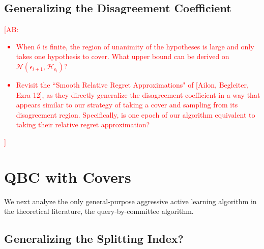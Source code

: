 \documentclass{article}[12pt]
\newcommand{\authcmt}[2]{\ifnum\Comments=1\textcolor{#1}{#2}\fi}
\newcommand{\akshay}[1]{\authcmt{red}      {[AB: #1]}}
\theoremstyle{named}
\newcommand{\cH}{\mathcal{H}}
\newcommand{\cN}{\mathcal{N}}
\begin{document}
\newpage
\subsection{Generalizing the Disagreement Coefficient}

\akshay{ 
\begin{itemize}
\item
When $\theta$ is finite, the region of unanimity of the hypotheses is large and only takes one hypothesis to cover. 
What upper bound can be derived on $\cN(\epsilon_{i+1}, \cH_{\epsilon_i})$?
\item
Revisit the ``Smooth Relative Regret Approximations" of [Ailon, Begleiter, Ezra 12], 
as they directly generalize the disagreement coefficient in a way that appears similar 
to our strategy of taking a cover and sampling from its disagreement region. 
Specifically, is one epoch of our algorithm equivalent to taking their relative regret approximation?
\end{itemize}}





\newpage
\section{QBC with Covers}
We next analyze the only general-purpose aggressive active learning algorithm in the theoretical literature, 
the query-by-committee algorithm. 


\subsection{Generalizing the Splitting Index?}
\end{document}
